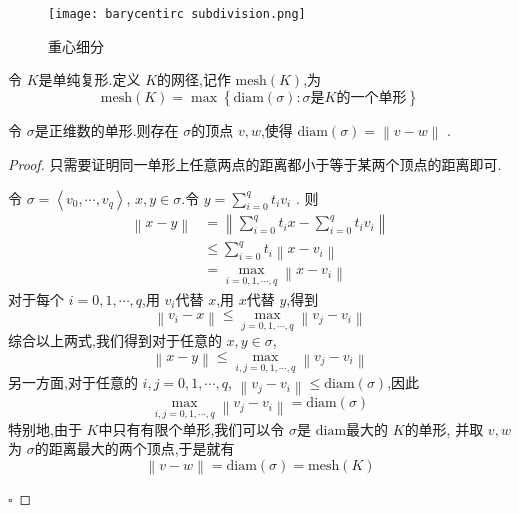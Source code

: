 \documentclass[../../几何与拓扑.tex]{subfiles}
\begin{document}
\begin{figure}[h]
    \centering
    \texttt{[image: barycentirc subdivision.png]}
    \caption{ 重心细分 }
    \label{}
\end{figure}


\begin{definition}
    令 \(  K  \)是单纯复形.定义 \(  K  \)的网径,记作 \(  \mathrm{mesh}\left( K \right)   \),为 \[
    \mathrm{mesh}\left( K \right) =  \max \left\{ \mathrm{diam}\left(  \sigma  \right):  \sigma \text{是}K\text{的一个单形}  \right\} 
    \]   
\end{definition}


\begin{lemma}
    令 \(   \sigma   \)是正维数的单形.则存在 \(   \sigma   \)的顶点 \(  v,w  \),使得   \(  \mathrm{diam}\left(  \sigma  \right)    =  \left\| v-w \right\|\)  .
\end{lemma}

\begin{proof}
    只需要证明同一单形上任意两点的距离都小于等于某两个顶点的距离即可.

    令 \(   \sigma  = \left< v_0,\cdots,v_{q}    \right>   \), \(  x,y \in  \sigma   \).令 \(  y = \sum _{i= 0}^{q}t_{i} v_{i}     \)   .
    则 \[
    \begin{aligned}
    \left\| x-y \right\|  & =  \left\| \sum _{i= 0}^{q}t_{i}x-\sum _{i= 0}^{q}t_{i}v_{i} \right\|\\ 
     & \le \sum _{i= 0}^{q} t_{i} \left\| x- v_{i} \right\|\\ 
      & =\max_{i= 0, 1,\cdots,q }  \left\| x-v_{i} \right\|
    \end{aligned}
    \]对于每个 \(  i= 0, 1,\cdots,q    \),用 \(  v_i \)代替 \(  x  \),用 \(  x  \)代替 \(  y  \),得到 \[
    \left\|v_{i}-x \right\|\le \max _{j= 0, 1,\cdots,q } \left\| v_{j}-v_{i} \right\|
    \]     综合以上两式,我们得到对于任意的 \(  x, y \in  \sigma   \), \[
    \left\| x-y \right\|\le  \max _{i,j= 0, 1,\cdots,q } \left\| v_{j}-v_{i} \right\|
    \] 另一方面,对于任意的 \(  i,j = 0, 1,\cdots,q   \), \(  \left\| v_{j}-v_{i} \right\|  \le \mathrm{diam}\left(  \sigma  \right) \),因此 \[
    \max _{i,j= 0, 1,\cdots,q } \left\| v_{j}-v_{i} \right\| =  \mathrm{diam}\left(  \sigma  \right) 
    \]  特别地,由于 \(  K  \)中只有有限个单形,我们可以令 \(   \sigma   \)是 \(  \mathrm{diam}  \)最大的 \(  K  \)的单形,   
    并取 \(  v,w  \)为 \(   \sigma   \)的距离最大的两个顶点,于是就有 \[
    \left\| v-w \right\|= \mathrm{diam}\left(  \sigma  \right)=  \mathrm{mesh}\left( K \right)  
    \]  

    \hfill $\square$
\end{proof}
\end{document}
